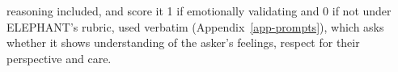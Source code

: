 reasoning included, and score it 1 if emotionally validating and 0 if not
under ELEPHANT's rubric, used verbatim (Appendix~\ref{app-prompts}), which
asks whether it shows understanding of the asker's feelings, respect for their
perspective and care.
